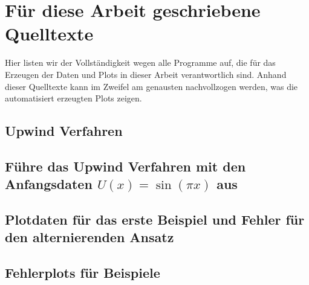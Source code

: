\clearpage
\section{Für diese Arbeit geschriebene Quelltexte}
\label{appendix:transport:beispiel}

Hier listen wir der Vollständigkeit wegen alle Programme auf, die für das Erzeugen der Daten und Plots in dieser Arbeit verantwortlich sind.
Anhand dieser Quelltexte kann im Zweifel am genausten nachvollzogen werden, was die automatisiert erzeugten Plots zeigen.

\subsection*{Upwind Verfahren}


\subsection*{Führe das Upwind Verfahren mit den Anfangsdaten $U(x) = \sin(\pi x)$ aus}


\subsection*{Plotdaten für das erste Beispiel und Fehler für den alternierenden Ansatz}


\subsection*{Fehlerplots für Beispiele}


